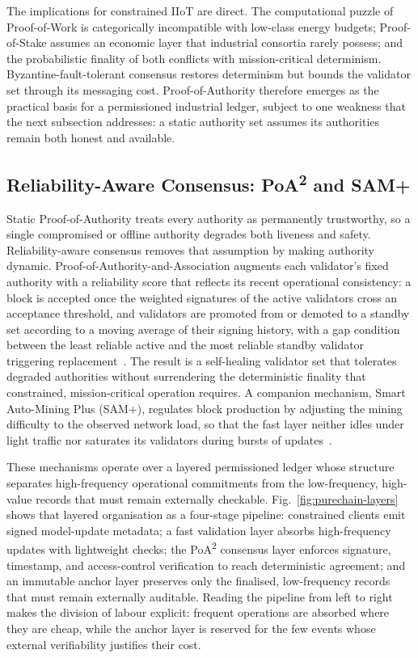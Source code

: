 The implications for constrained IIoT are direct. The computational puzzle of
Proof-of-Work is categorically incompatible with low-class energy budgets;
Proof-of-Stake assumes an economic layer that industrial consortia rarely
possess; and the probabilistic finality of both conflicts with mission-critical
determinism. Byzantine-fault-tolerant consensus restores determinism but bounds
the validator set through its messaging cost. Proof-of-Authority therefore
emerges as the practical basis for a permissioned industrial ledger, subject to
one weakness that the next subsection addresses: a static authority set assumes
its authorities remain both honest and available.

\subsection{Reliability-Aware Consensus: PoA\textsuperscript{2} and SAM+}
\label{subsec:poa2-sam}

Static Proof-of-Authority treats every authority as permanently trustworthy, so
a single compromised or offline authority degrades both liveness and safety.
Reliability-aware consensus removes that assumption by making authority dynamic.
Proof-of-Authority-and-Association augments each validator's fixed authority
with a reliability score that reflects its recent operational consistency: a
block is accepted once the weighted signatures of the active validators cross an
acceptance threshold, and validators are promoted from or demoted to a standby
set according to a moving average of their signing history, with a gap condition
between the least reliable active and the most reliable standby validator
triggering replacement~\cite{kim2025proof}. The result is a self-healing
validator set that tolerates degraded authorities without surrendering the
deterministic finality that constrained, mission-critical operation requires. A
companion mechanism, Smart Auto-Mining Plus (SAM+), regulates block production
by adjusting the mining difficulty to the observed network load, so that the
fast layer neither idles under light traffic nor saturates its validators during
bursts of updates~\cite{purechain_wp}.

These mechanisms operate over a layered permissioned ledger whose structure
separates high-frequency operational commitments from the low-frequency,
high-value records that must remain externally checkable.
Fig.~\ref{fig:purechain-layers} shows that layered organisation as a four-stage
pipeline: constrained clients emit signed model-update metadata; a fast
validation layer absorbs high-frequency updates with lightweight checks; the
PoA\textsuperscript{2} consensus layer enforces signature, timestamp, and
access-control verification to reach deterministic agreement; and an immutable
anchor layer preserves only the finalised, low-frequency records that must
remain externally auditable. Reading the pipeline from left to right makes the
division of labour explicit: frequent operations are absorbed where they are
cheap, while the anchor layer is reserved for the few events whose external
verifiability justifies their cost.

